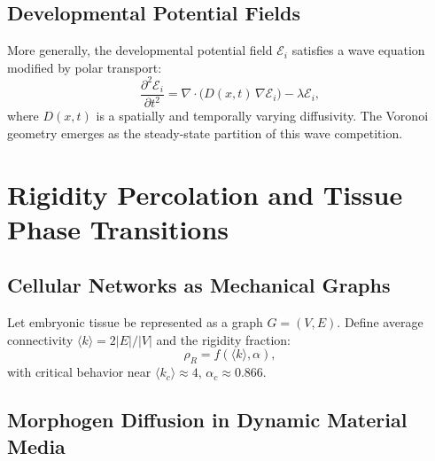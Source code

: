 \documentclass[12pt, a4paper, openany]{book}
\theoremstyle{definition}
\theoremstyle{remark}
\begin{document}
\begin{appendices}
\section{Developmental Potential Fields}

More generally, the developmental potential field $\mathcal{E}_i$ satisfies a wave equation modified by polar transport:
\begin{equation}
\frac{\partial^2 \mathcal{E}_i}{\partial t^2} = \nabla \cdot \big(D(x,t)\,\nabla \mathcal{E}_i\big) - \lambda \mathcal{E}_i,
\end{equation}
where $D(x,t)$ is a spatially and temporally varying diffusivity. The Voronoi geometry emerges as the steady-state partition of this wave competition.

\chapter{Rigidity Percolation and Tissue Phase Transitions}

\section{Cellular Networks as Mechanical Graphs}

Let embryonic tissue be represented as a graph $G = (V, E)$. Define average connectivity $\langle k \rangle = 2|E|/|V|$ and the rigidity fraction:
\begin{equation}
\rho_R = f\!\left(\langle k \rangle, \alpha\right),
\end{equation}
with critical behavior near $\langle k_c \rangle \approx 4$, $\alpha_c \approx 0.866$.

\section{Morphogen Diffusion in Dynamic Material Media}


\end{appendices}
\end{document}
